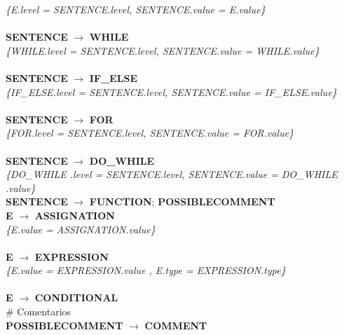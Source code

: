 \documentclass[10pt,a4paper]{article}
\begin{document}
\textit{\{E.level = SENTENCE.level, SENTENCE.value = E.value\}}  \\ \\

\textbf{SENTENCE} $\rightarrow$ \textbf{WHILE} \\ 

\textit{\{WHILE.level = SENTENCE.level, SENTENCE.value = WHILE.value\}}  \\ \\

\textbf{SENTENCE} $\rightarrow$ \textbf{IF\_ELSE}  \\ 

\textit{\{IF\_ELSE.level = SENTENCE.level, SENTENCE.value = IF\_ELSE.value\}}  \\ \\

\textbf{SENTENCE} $\rightarrow$ \textbf{FOR} \\ 

\textit{\{FOR.level = SENTENCE.level, SENTENCE.value = FOR.value\}}  \\ \\

\textbf{SENTENCE} $\rightarrow$ \textbf{DO\_WHILE} \\ 

\textit{\{DO\_WHILE .level = SENTENCE.level, SENTENCE.value = DO\_WHILE .value\}}  \\

\textbf{SENTENCE} $\rightarrow$ \textbf{FUNCTION}; \textbf{POSSIBLECOMMENT} \\

\textbf{E} $\rightarrow$ \textbf{ASSIGNATION}   \\

\textit{\{E.value = ASSIGNATION.value\}} \\ \\

\textbf{E} $\rightarrow$ \textbf{EXPRESSION} \\

\textit{\{E.value = EXPRESSION.value  , E.type = EXPRESSION.type\}}  \\ \\

\textbf{E} $\rightarrow$ \textbf{CONDITIONAL} \\


\# Comentarios\\


\textbf{POSSIBLECOMMENT} $\rightarrow$ \textbf{COMMENT}
\end{document}
